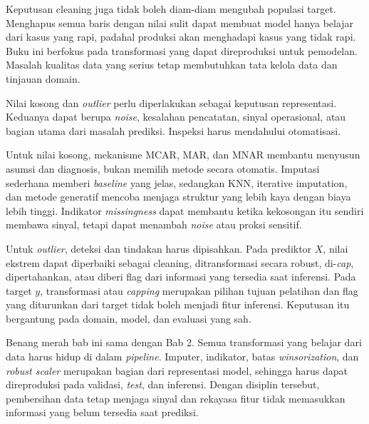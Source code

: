 Keputusan cleaning juga tidak boleh diam-diam mengubah populasi target. Menghapus semua baris dengan nilai sulit dapat membuat model hanya belajar dari kasus yang rapi, padahal produksi akan menghadapi kasus yang tidak rapi. Buku ini berfokus pada transformasi yang dapat direproduksi untuk pemodelan. Masalah kualitas data yang serius tetap membutuhkan tata kelola data dan tinjauan domain.

\begin{sintesis}

Nilai kosong dan \emph{outlier} perlu diperlakukan sebagai keputusan representasi. Keduanya dapat berupa \emph{noise}, kesalahan pencatatan, sinyal operasional, atau bagian utama dari masalah prediksi. Inspeksi harus mendahului otomatisasi.

Untuk nilai kosong, mekanisme MCAR, MAR, dan MNAR membantu menyusun asumsi dan diagnosis, bukan memilih metode secara otomatis. Imputasi sederhana memberi \emph{baseline} yang jelas, sedangkan KNN, iterative imputation, dan metode generatif mencoba menjaga struktur yang lebih kaya dengan biaya lebih tinggi. Indikator \emph{missingness} dapat membantu ketika kekosongan itu sendiri membawa sinyal, tetapi dapat menambah \emph{noise} atau proksi sensitif.

Untuk \emph{outlier}, deteksi dan tindakan harus dipisahkan. Pada prediktor \(X\), nilai ekstrem dapat diperbaiki sebagai cleaning, ditransformasi secara robust, di-\emph{cap}, dipertahankan, atau diberi flag dari informasi yang tersedia saat inferensi. Pada target \(y\), transformasi atau \emph{capping} merupakan pilihan tujuan pelatihan dan flag yang diturunkan dari target tidak boleh menjadi fitur inferensi. Keputusan itu bergantung pada domain, model, dan evaluasi yang sah.

Benang merah bab ini sama dengan Bab 2. Semua transformasi yang belajar dari data harus hidup di dalam \emph{pipeline}. Imputer, indikator, batas \emph{winsorization}, dan \emph{robust scaler} merupakan bagian dari representasi model, sehingga harus dapat direproduksi pada validasi, \emph{test}, dan inferensi. Dengan disiplin tersebut, pembersihan data tetap menjaga sinyal dan rekayasa fitur tidak memasukkan informasi yang belum tersedia saat prediksi.

\end{sintesis}

